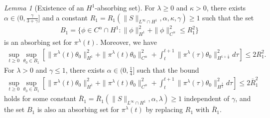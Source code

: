 \documentclass[reqno]{amsart}%
\theoremstyle{definition}
\theoremstyle{remark}
\numberwithin{equation}{section}
\newtheorem{lemma}[theorem]{Lemma}
\newcommand{\1}{\mathbf{1}}
\newcommand{\pin}{\pi^{\lambda}}
\numberwithin{equation}{section}
\numberwithin{theorem}{section}
\numberwithin{figure}{section}
\begin{document}
\begin{lemma}[Existence of an $H^1$-absorbing set]\label{Existence of an H1 absorbing set lemma}
For $\lambda\ge0$ and $\kappa>0$, there exists $\alpha\in(0,\frac{\gamma}{3+\gamma}]$ and a constant $R_1=R_1(\|S\|_{L^\infty\cap H^1},\alpha,\kappa,\gamma)\ge1$ such that the set
\begin{align*}
B_1=\{\phi\in C^{\alpha}\cap H^1:\|\phi\|^2_{H^1}+\|\phi\|^2_{C^\alpha}\le R^2_{1}\}
\end{align*}
is an absorbing set for $\pin(t)$. Moreover, we have
\begin{align}\label{bound on time integral on theta in H 1+gamma/2}
\sup_{t\ge0}\sup_{\theta_0\in B_1}\left[\|\pin(t)\theta_0\|^2_{H^1}+\|\pin(t)\theta_0\|^2_{C^\alpha}+\int_t^{t+1}\|\pin(\tau)\theta_0\|^2_{H^{1+\frac{\gamma}{2}}}d\tau\right]\le 2R_1^2.
\end{align}
For $\lambda>0$ and $\gamma\le1$, there exists $\alpha\in(0,\frac{1}{4}]$ such that the bound 
\begin{align}\label{bound on time integral on theta in H 1+1/2 gamma=1}
\sup_{t\ge0}\sup_{\theta_0\in B_1}\left[\|\pin(t)\theta_0\|^2_{H^1}+\|\pin(t)\theta_0\|^2_{C^\alpha}+\int_t^{t+1}\|\pin(\tau)\theta_0\|^2_{H^{\frac{3}{2}}}d\tau\right]\le 2\bar{R}_1^2
\end{align}
holds for some constant $\bar{R}_1=\bar{R}_1(\|S\|_{L^\infty\cap H^1},\alpha,\lambda)\ge1$ independent of $\gamma$, and the set $B_1$ is also an absorbing set for $\pin(t)$ by replacing $R_1$ with $\bar{R}_1$.
\end{lemma}
\end{document}
